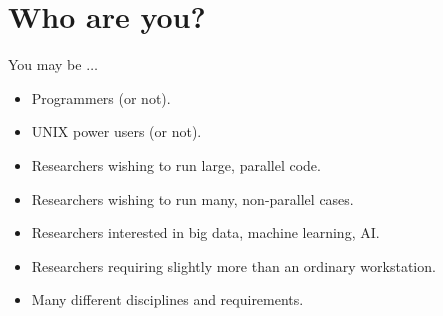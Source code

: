\documentclass[handout]{beamer} %
\begin{document}
{
\section{Who are you?}
%
\begin{frame}{You may be $\ldots$}
  \begin{itemize}
  \item{Programmers (or not).}\pause
  \item{UNIX power users (or not).}\pause
  \item{Researchers wishing to run large, parallel code.}\pause
  \item{Researchers wishing to run many, non-parallel cases.}\pause
  \item{Researchers interested in big data, machine learning, AI.}\pause
  \item{Researchers requiring slightly more than an ordinary workstation.}\pause
  \item{\alert{Many different disciplines and requirements.}}
\end{itemize}
\end{frame}
}
\end{document}
